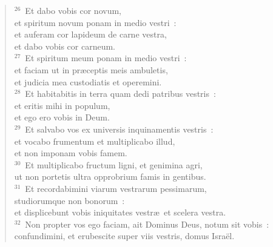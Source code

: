 \begin{verse}
${}^{26}$~Et dabo vobis cor novum,\\ et spiritum novum ponam in medio vestri~:\\ et auferam cor lapideum de carne vestra,\\ et dabo vobis cor carneum.\\
${}^{27}$~Et spiritum meum ponam in medio vestri~:\\ et faciam ut in pr\ae ceptis meis ambuletis,\\ et judicia mea custodiatis et operemini.\\
${}^{28}$~Et habitabitis in terra quam dedi patribus vestris~:\\ et eritis mihi in populum,\\ et ego ero vobis in Deum.\\
${}^{29}$~Et salvabo vos ex universis inquinamentis vestris~:\\ et vocabo frumentum et multiplicabo illud,\\ et non imponam vobis famem.\\
${}^{30}$~Et multiplicabo fructum ligni, et genimina agri,\\ ut non portetis ultra opprobrium famis in gentibus.\\
${}^{31}$~Et recordabimini viarum vestrarum pessimarum,\\ studiorumque non bonorum~:\\ et displicebunt vobis iniquitates vestr\ae\ et scelera vestra.\\
${}^{32}$~Non propter vos ego faciam, ait Dominus Deus, notum sit vobis~:\\ confundimini, et erubescite super viis vestris, domus Isra\"el.\end{verse}


